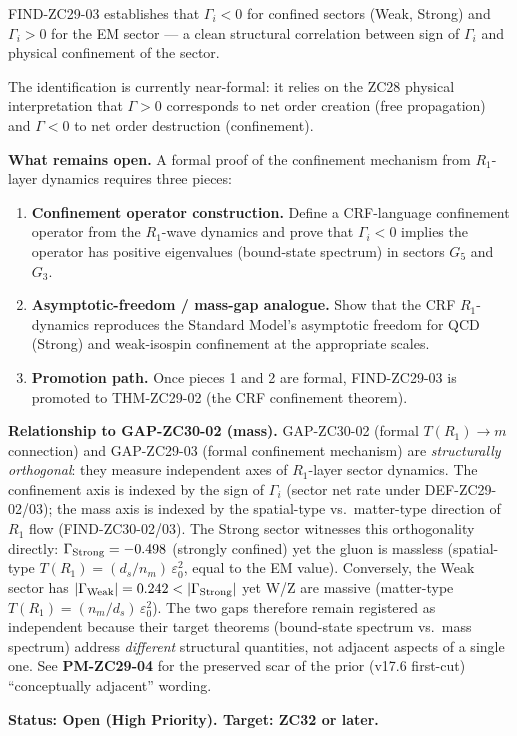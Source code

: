 \documentclass[12pt, a4paper]{article}
\begin{document}
\begin{openqbox}[title={GAP-ZC29-03: Formal Confinement Mechanism
  from $R_1$-Layer Dynamics (NEW v17.6 patch, High Priority)}]
FIND-ZC29-03 establishes that $\Gamma_i < 0$ for confined sectors
(Weak, Strong) and $\Gamma_i > 0$ for the EM sector --- a
clean structural correlation between sign of $\Gamma_i$ and
physical confinement of the sector.

The identification is currently near-formal: it relies on the
ZC28 physical interpretation that $\Gamma > 0$ corresponds to
net order creation (free propagation) and $\Gamma < 0$ to net
order destruction (confinement).

\textbf{What remains open.}
A formal proof of the confinement mechanism from $R_1$-layer
dynamics requires three pieces:
\begin{enumerate}[leftmargin=*, noitemsep]
  \item \textbf{Confinement operator construction.}
    Define a CRF-language confinement operator from the
    $R_1$-wave dynamics and prove that $\Gamma_i < 0$ implies
    the operator has positive eigenvalues (bound-state
    spectrum) in sectors $G_5$ and $G_3$.
  \item \textbf{Asymptotic-freedom / mass-gap analogue.}
    Show that the CRF $R_1$-dynamics reproduces the
    Standard Model's asymptotic freedom for QCD (Strong)
    and weak-isospin confinement at the appropriate scales.
  \item \textbf{Promotion path.}
    Once pieces 1 and 2 are formal, FIND-ZC29-03 is promoted
    to THM-ZC29-02 (the CRF confinement theorem).
\end{enumerate}

\textbf{Relationship to GAP-ZC30-02 (mass).}
GAP-ZC30-02 (formal $T(R_1) \to m$ connection) and GAP-ZC29-03
(formal confinement mechanism) are \emph{structurally
orthogonal}: they measure independent axes of $R_1$-layer
sector dynamics. The confinement axis is indexed by the
sign of $\Gamma_i$ (sector net rate under DEF-ZC29-02/03);
the mass axis is indexed by the spatial-type vs.\ matter-type
direction of $R_1$ flow (FIND-ZC30-02/03). The Strong sector
witnesses this orthogonality directly: $\Gamma_{\rm Strong}
= -0.498$ (strongly confined) yet the gluon is massless
(spatial-type $T(R_1) = (d_s/n_m)\,\varepsilon_0^2$, equal
to the EM value). Conversely, the Weak sector has
$|\Gamma_{\rm Weak}| = 0.242 < |\Gamma_{\rm Strong}|$ yet
W/Z are massive (matter-type $T(R_1) =
(n_m/d_s)\,\varepsilon_0^2$). The two gaps therefore remain
registered as independent because their target theorems
(bound-state spectrum vs.\ mass spectrum) address
\emph{different} structural quantities, not adjacent
aspects of a single one. See \textbf{PM-ZC29-04} for the
preserved scar of the prior (v17.6 first-cut) ``conceptually
adjacent'' wording.

\textbf{Status: Open (High Priority). Target: ZC32 or later.}
\end{openqbox}
\end{document}
